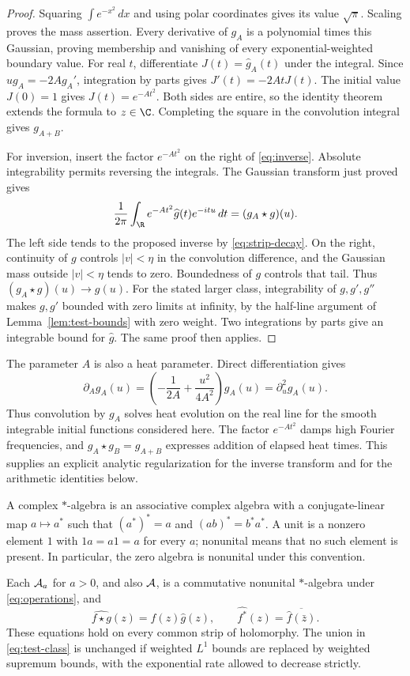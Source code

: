 \begin{proof}
Squaring $\int e^{-x^2}\,dx$ and using polar coordinates gives its value
$\sqrt\pi$.  Scaling proves the mass assertion.
Every derivative of $g_A$ is a polynomial times this Gaussian, proving
membership and vanishing of every exponential-weighted boundary value.
For real $t$, differentiate $J(t)=\widehat g_A(t)$ under the integral.
Since $u g_A=-2A g_A'$, integration by parts gives
$J'(t)=-2AtJ(t)$.  The initial value $J(0)=1$ gives $J(t)=e^{-At^2}$.
Both sides are entire, so the identity theorem extends the formula to $z\in\C$.
Completing the square in the convolution integral gives $g_{A+B}$.

For inversion, insert the factor $e^{-At^2}$ on the right of
\eqref{eq:inverse}.  Absolute integrability permits reversing the integrals.
The Gaussian transform just proved gives
\[
 \frac1{2\pi}\int_{\R}e^{-At^2}\widehat g(t)e^{-itu}\,dt
       =(g_A\star g)(u).
\]
The left side tends to the proposed inverse by \eqref{eq:strip-decay}.
On the right, continuity of $g$ controls $|v|<\eta$ in the convolution
difference, and the Gaussian mass outside $|v|<\eta$ tends to zero.
Boundedness of $g$ controls that tail.  Thus $(g_A\star g)(u)\to g(u)$.
For the stated larger class, integrability of $g,g',g''$ makes $g,g'$
bounded with zero limits at infinity, by the half-line argument of
Lemma~\ref{lem:test-bounds} with zero weight.
Two integrations by parts give an integrable bound for $\widehat g$.
The same proof then applies.
\end{proof}

The parameter $A$ is also a heat parameter.  Direct differentiation gives
\[
 \partial_A g_A(u)=\left(-\frac1{2A}+\frac{u^2}{4A^2}\right)g_A(u)
                  =\partial_u^2g_A(u).
\]
Thus convolution by $g_A$ solves heat evolution on the real line for the
smooth integrable initial functions considered here.
The factor $e^{-At^2}$ damps high Fourier frequencies, and
$g_A\star g_B=g_{A+B}$ expresses addition of elapsed heat times.
This supplies an explicit analytic regularization for the inverse transform
and for the arithmetic identities below.

A complex $*$-algebra is an associative complex algebra with a conjugate-linear
map $a\mapsto a^*$ such that $(a^*)^*=a$ and $(ab)^*=b^*a^*$.
A unit is a nonzero element $1$ with $1a=a1=a$ for every $a$;
nonunital means that no such element is present.
In particular, the zero algebra is nonunital under this convention.

\begin{proposition}
\label{prop:algebra}
Each $\mathcal A_a$ for $a>0$, and also $\mathcal A$, is a commutative nonunital
$*$-algebra under \eqref{eq:operations}, and
\begin{equation}
 \widehat{f\star g}(z)=\widehat f(z)\widehat g(z),\qquad
 \widehat{f^*}(z)=\overline{\widehat f(\bar z)}.
 \label{eq:star-transform}
\end{equation}
These equations hold on every common strip of holomorphy.
The union in \eqref{eq:test-class} is unchanged if weighted $L^1$ bounds
are replaced by weighted supremum bounds, with the exponential rate allowed
to decrease strictly.
\end{proposition}

